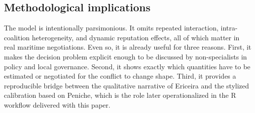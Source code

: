\subsection{Methodological implications}

The model is intentionally parsimonious. It omits repeated interaction, intra-coalition heterogeneity, and dynamic reputation effects, all of which matter in real maritime negotiations. Even so, it is already useful for three reasons. First, it makes the decision problem explicit enough to be discussed by non-specialists in policy and local governance. Second, it shows exactly which quantities have to be estimated or negotiated for the conflict to change shape. Third, it provides a reproducible bridge between the qualitative narrative of Ericeira and the stylized calibration based on Peniche, which is the role later operationalized in the R workflow delivered with this paper.
